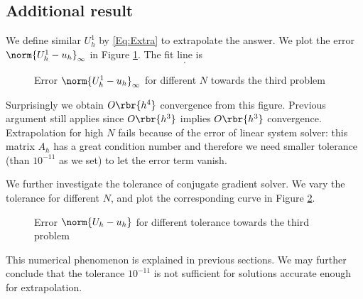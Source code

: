 \documentclass[english, nochinese]{pnote}
\newcommand\normi[1]{\norm{#1}_{\infty}}
\begin{document}
\subsection{Additional result}

We define similar $U_h^1$ by \eqref{Eq:Extra} to extrapolate the answer. We plot the error $ \normi{ U_h^1 - u_h } $ in Figure \ref{Fig:Prob3Extra}. The fit line is
\begin{equation}
.
\end{equation}

\begin{figure}[htbp]
\centering

\caption{Error $ \normi{ U_h^1 - u_h } $ for different $N$ towards the third problem}
\label{Fig:Prob3Extra}
\end{figure}

Surprisingly we obtain $ O \rbr{h^4} $ convergence from this figure. Previous argument still applies since $ O \rbr{h^3} $ implies $ O \rbr{h^3} $ convergence. Extrapolation for high $N$ fails because of the error of linear system solver: this matrix $A_h$ has a great condition number and therefore we need smaller tolerance (than $10^{-11}$ as we set) to let the error term vanish.

We further investigate the tolerance of conjugate gradient solver. We vary the tolerance for different $N$, and plot the corresponding curve in Figure \ref{Fig:Prob3Tol}.

\begin{figure}[htbp]
\centering

\caption{Error $ \norm{ U_h - u_h } $ for different tolerance towards the third problem}
\label{Fig:Prob3Tol}
\end{figure}

This numerical phenomenon is explained in previous sections. We may further conclude that the tolerance $10^{-11}$ is not sufficient for solutions accurate enough for extrapolation.
\end{document}
